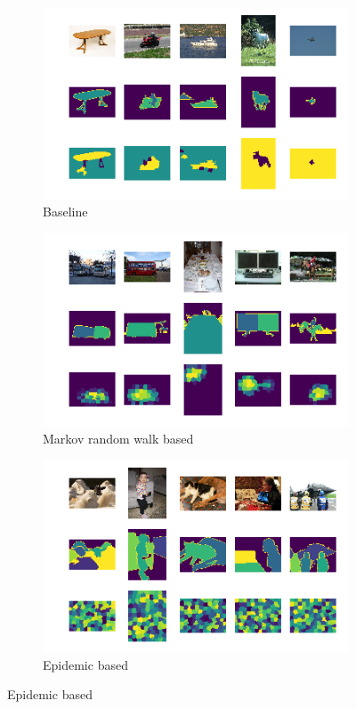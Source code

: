 \documentclass[twocolumn]{article}
\begin{document}
\begin{figure}[t!]
\centering

  \begin{subfigure}{\linewidth}
    \includegraphics[width=\linewidth]{figs/baseline_best.png}
    \caption{Baseline}
  \end{subfigure}

  \begin{subfigure}{\linewidth}
    \includegraphics[width=\linewidth]{figs/markov_best.png}
    \caption{Markov random walk based}
  \end{subfigure}

  \begin{subfigure}{\linewidth}
    \includegraphics[width=\linewidth]{figs/epidemic_best.png}
    \caption{Epidemic based}
  \end{subfigure}


\end{figure}
\end{document}
